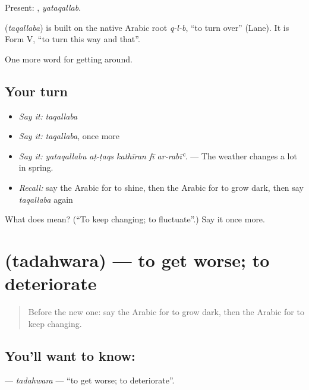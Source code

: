 Present: , \emph{yataqallab}.

\begin{cousinweb}
\textbf{} (\emph{taqallaba}) is built on the native Arabic root \emph{q-l-b}, \textquotedblleft{}to turn over\textquotedblright{} (Lane). It is Form V, \textquotedblleft{}to turn this way and that\textquotedblright{}.
\end{cousinweb}

\begin{grammarlens}[title={What you've built}]
One more word for getting around.
\end{grammarlens}

\subsection*{Your turn}
\begin{itemize}
\raggedright
  \item \emph{Say it:} \emph{taqallaba}
  \item \emph{Say it:} \emph{taqallaba}, once more
  \item \emph{Say it:} \emph{yataqallabu aṭ-ṭaqs kathīran fī ar-rabīʿ.} — The weather changes a lot in spring.
  \item \emph{Recall:} say the Arabic for to shine, then the Arabic for to grow dark, then say \emph{taqallaba} again
\end{itemize}

\begin{tcolorbox}[breakable,colback=teal!4,colframe=teal!35!black,title={Before you move on}]
What does  mean? (\textquotedblleft{}To keep changing; to fluctuate\textquotedblright{}.) Say it once more.
\end{tcolorbox}
\section[\texorpdfstring{\ar{تدهور} (tadahwara)}{تدهور (tadahwara)}]{ (tadahwara) — to get worse; to deteriorate}

\label{lesson:AR-C486-tadahwara}



\begin{quote}
Before the new one: say the Arabic for to grow dark, then the Arabic for to keep changing.
\end{quote}

\subsection*{You'll want to know: }
\textbf{} — \emph{tadahwara} — \textquotedblleft{}to get worse; to deteriorate\textquotedblright{}.

